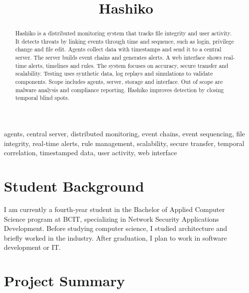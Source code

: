 \documentclass[conference]{IEEEtran}
\begin{document}
\title{Hashiko\\
}

\author{
}

\maketitle

\begin{abstract}
Hashiko is a distributed monitoring system that tracks file integrity and user activity. It detects threats by linking events through time and sequence, such as login, privilege change and file edit. Agents collect data with timestamps and send it to a central server. The server builds event chains and generates alerts. A web interface shows real-time alerts, timelines and rules. The system focuses on accuracy, secure transfer and scalability. Testing uses synthetic data, log replays and simulations to validate components. Scope includes agents, server, storage and interface. Out of scope are malware analysis and compliance reporting. Hashiko improves detection by closing temporal blind spots.
\end{abstract}

\begin{IEEEkeywords}
    agents, central server, distributed monitoring, event chains, event sequencing, file integrity, real-time alerts, rule management, scalability, secure transfer, temporal correlation, timestamped data, user activity, web interface
\end{IEEEkeywords}

\section{Student Background}
I am currently a fourth-year student in the Bachelor of Applied Computer Science program at BCIT, specializing in Network Security Applications Development. Before studying computer science, I studied architecture and briefly worked in the industry. After graduation, I plan to work in software development or IT.

\section{Project Summary}
\end{document}
